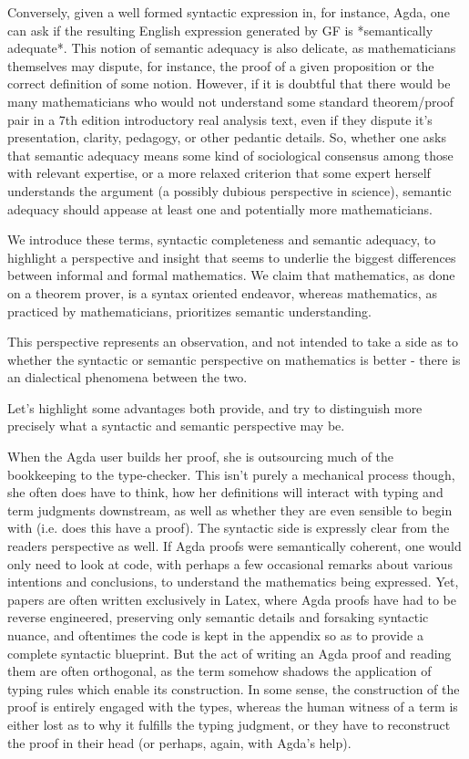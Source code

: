 Conversely, given a well formed syntactic expression in, for instance, Agda, one
can ask if the resulting English expression generated by GF is *semantically
adequate*. This notion of semantic adequacy is also delicate, as mathematicians
themselves may dispute, for instance, the proof of a given proposition or the
correct definition of some notion. However, if it is doubtful that there would
be many mathematicians who would not understand some standard theorem/proof pair
in a 7th edition introductory real analysis text, even if they dispute it's
presentation, clarity, pedagogy, or other pedantic details. So, whether one asks
that semantic adequacy means some kind of sociological consensus among those
with relevant expertise, or a more relaxed criterion that some expert herself
understands the argument (a possibly dubious perspective in science), semantic
adequacy should appease at least one and potentially more mathematicians.

We introduce these terms, syntactic completeness and semantic adequacy, to
highlight a perspective and insight that seems to underlie the biggest
differences between informal and formal mathematics. We claim that mathematics,
as done on a theorem prover, is a syntax oriented endeavor, whereas mathematics,
as practiced by mathematicians, prioritizes semantic understanding.

This perspective represents an observation, and not intended to take a side as
to whether the syntactic or semantic perspective on mathematics is better -
there is an dialectical phenomena between the two.

Let's highlight some advantages both provide, and try to distinguish more
precisely what a syntactic and semantic perspective may be.

When the Agda user builds her proof, she is outsourcing much of the bookkeeping
to the type-checker. This isn't purely a mechanical process though, she often
does have to think, how her definitions will interact with typing and term
judgments downstream, as well as whether they are even sensible to begin with
(i.e. does this have a proof). The syntactic side is expressly clear from the
readers perspective as well. If Agda proofs were semantically coherent, one
would only need to look at code, with perhaps a few occasional remarks about
various intentions and conclusions, to understand the mathematics being
expressed. Yet, papers are often written exclusively in Latex, where Agda proofs
have had to be reverse engineered, preserving only semantic details and
forsaking syntactic nuance, and oftentimes the code is kept in the appendix so
as to provide a complete syntactic blueprint. But the act of writing an Agda
proof and reading them are often orthogonal, as the term somehow shadows the
application of typing rules which enable its construction. In some sense, the
construction of the proof is entirely engaged with the types, whereas the human
witness of a term is either lost as to why it fulfills the typing judgment, or
they have to reconstruct the proof in their head (or perhaps, again, with Agda's
help).

